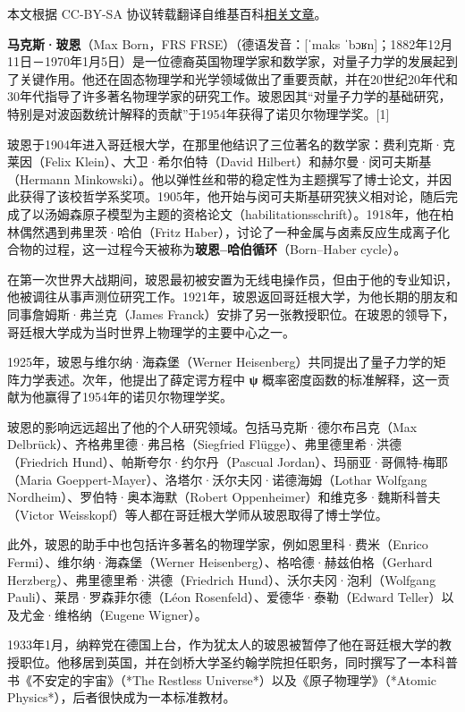 
本文根据 CC-BY-SA 协议转载翻译自维基百科\href{https://en.wikipedia.org/wiki/Max_Born}{相关文章}。

\textbf{马克斯·玻恩}（Max Born，FRS FRSE）（德语发音：[ˈmaks ˈbɔʁn]；1882年12月11日－1970年1月5日）是一位德裔英国物理学家和数学家，对量子力学的发展起到了关键作用。他还在固态物理学和光学领域做出了重要贡献，并在20世纪20年代和30年代指导了许多著名物理学家的研究工作。玻恩因其“对量子力学的基础研究，特别是对波函数统计解释的贡献”于1954年获得了诺贝尔物理学奖。[1]

玻恩于1904年进入哥廷根大学，在那里他结识了三位著名的数学家：费利克斯·克莱因（Felix Klein）、大卫·希尔伯特（David Hilbert）和赫尔曼·闵可夫斯基（Hermann Minkowski）。他以弹性丝和带的稳定性为主题撰写了博士论文，并因此获得了该校哲学系奖项。1905年，他开始与闵可夫斯基研究狭义相对论，随后完成了以汤姆森原子模型为主题的资格论文（habilitationsschrift）。1918年，他在柏林偶然遇到弗里茨·哈伯（Fritz Haber），讨论了一种金属与卤素反应生成离子化合物的过程，这一过程今天被称为\textbf{玻恩–哈伯循环}（Born–Haber cycle）。

在第一次世界大战期间，玻恩最初被安置为无线电操作员，但由于他的专业知识，他被调往从事声测位研究工作。1921年，玻恩返回哥廷根大学，为他长期的朋友和同事詹姆斯·弗兰克（James Franck）安排了另一张教授职位。在玻恩的领导下，哥廷根大学成为当时世界上物理学的主要中心之一。

1925年，玻恩与维尔纳·海森堡（Werner Heisenberg）共同提出了量子力学的矩阵力学表述。次年，他提出了薛定谔方程中 \textbf{ψ\ψ} 概率密度函数的标准解释，这一贡献为他赢得了1954年的诺贝尔物理学奖。

玻恩的影响远远超出了他的个人研究领域。包括马克斯·德尔布吕克（Max Delbrück）、齐格弗里德·弗吕格（Siegfried Flügge）、弗里德里希·洪德（Friedrich Hund）、帕斯夸尔·约尔丹（Pascual Jordan）、玛丽亚·哥佩特-梅耶（Maria Goeppert-Mayer）、洛塔尔·沃尔夫冈·诺德海姆（Lothar Wolfgang Nordheim）、罗伯特·奥本海默（Robert Oppenheimer）和维克多·魏斯科普夫（Victor Weisskopf）等人都在哥廷根大学师从玻恩取得了博士学位。

此外，玻恩的助手中也包括许多著名的物理学家，例如恩里科·费米（Enrico Fermi）、维尔纳·海森堡（Werner Heisenberg）、格哈德·赫兹伯格（Gerhard Herzberg）、弗里德里希·洪德（Friedrich Hund）、沃尔夫冈·泡利（Wolfgang Pauli）、莱昂·罗森菲尔德（Léon Rosenfeld）、爱德华·泰勒（Edward Teller）以及尤金·维格纳（Eugene Wigner）。

1933年1月，纳粹党在德国上台，作为犹太人的玻恩被暂停了他在哥廷根大学的教授职位。他移居到英国，并在剑桥大学圣约翰学院担任职务，同时撰写了一本科普书《不安定的宇宙》（*The Restless Universe*）以及《原子物理学》（*Atomic Physics*），后者很快成为一本标准教材。

